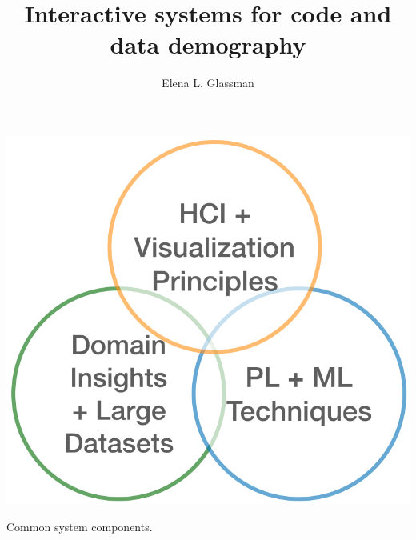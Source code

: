 \documentclass[justified]{tufte-handout}
\title{Interactive systems for code and data demography}
\author[Elena L. Glassman]{Elena L. Glassman}
\begin{document}
\fontsize{9pt}{12pt}\selectfont

\maketitle%

\begin{marginfigure}%
  \centering
  \includegraphics[width=\linewidth]{Summary_figure1.png}
  \caption{Common system components.}
  \label{fig:summaryfig1}
\end{marginfigure}
\end{document}
